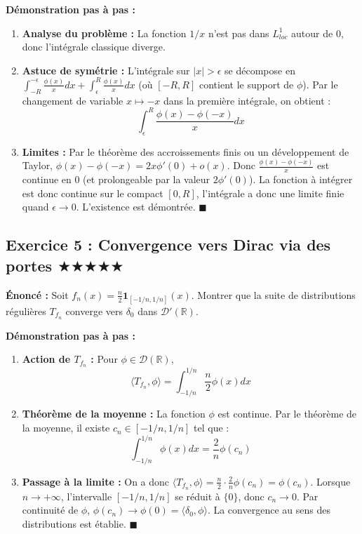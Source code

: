 \documentclass[11pt,a4paper]{article}
\begin{document}
\textbf{Démonstration pas à pas :}
\begin{enumerate}
\item \textbf{Analyse du problème :} La fonction $1/x$ n'est pas dans $L^1_{loc}$ autour de 0, donc l'intégrale classique diverge.
\item \textbf{Astuce de symétrie :} L'intégrale sur $|x| > \epsilon$ se décompose en $\int_{-R}^{-\epsilon} \frac{\phi(x)}{x} dx + \int_{\epsilon}^{R} \frac{\phi(x)}{x} dx$ (où $[-R, R]$ contient le support de $\phi$).
   Par le changement de variable $x \mapsto -x$ dans la première intégrale, on obtient :
   $$ \int_{\epsilon}^{R} \frac{\phi(x) - \phi(-x)}{x} dx $$
\item \textbf{Limites :} Par le théorème des accroissements finis ou un développement de Taylor, $\phi(x) - \phi(-x) = 2x \phi'(0) + o(x)$.
   Donc $\frac{\phi(x) - \phi(-x)}{x}$ est continue en 0 (et prolongeable par la valeur $2\phi'(0)$).
   La fonction à intégrer est donc continue sur le compact $[0, R]$, l'intégrale a donc une limite finie quand $\epsilon \to 0$.
   L'existence est démontrée. $\blacksquare$
\end{enumerate}




\subsection*{Exercice 5 : Convergence vers Dirac via des portes \quad $\bigstar\bigstar\bigstar\bigstar\bigstar$}

\textbf{Énoncé :}
Soit $f_n(x) = \frac{n}{2} \mathbf{1}_{[-1/n, 1/n]}(x)$. Montrer que la suite de distributions régulières $T_{f_n}$ converge vers $\delta_0$ dans $\mathcal{D}'(\mathbb{R})$.

\textbf{Démonstration pas à pas :}
\begin{enumerate}
\item \textbf{Action de $T_{f_n}$ :} Pour $\phi \in \mathcal{D}(\mathbb{R})$,
   $$ \langle T_{f_n}, \phi \rangle = \int_{-1/n}^{1/n} \frac{n}{2} \phi(x) dx $$
\item \textbf{Théorème de la moyenne :} La fonction $\phi$ est continue. Par le théorème de la moyenne, il existe $c_n \in [-1/n, 1/n]$ tel que :
   $$ \int_{-1/n}^{1/n} \phi(x) dx = \frac{2}{n} \phi(c_n) $$
\item \textbf{Passage à la limite :} On a donc $\langle T_{f_n}, \phi \rangle = \frac{n}{2} \cdot \frac{2}{n} \phi(c_n) = \phi(c_n)$.
   Lorsque $n \to +\infty$, l'intervalle $[-1/n, 1/n]$ se réduit à $\{0\}$, donc $c_n \to 0$.
   Par continuité de $\phi$, $\phi(c_n) \to \phi(0) = \langle \delta_0, \phi \rangle$.
   La convergence au sens des distributions est établie. $\blacksquare$
\end{enumerate}
\end{document}
